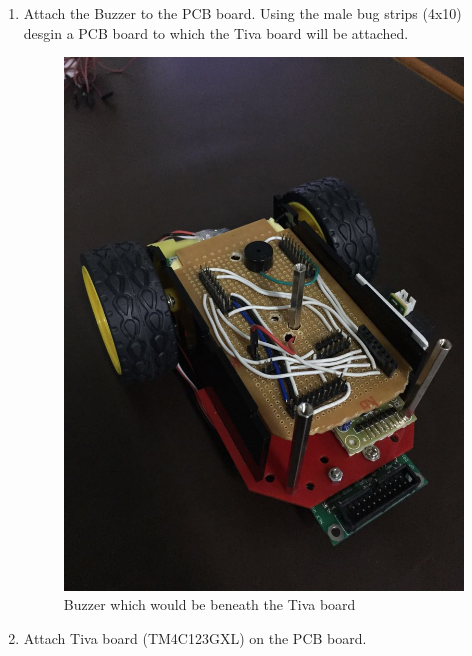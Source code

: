 \documentclass[a4paper,12pt,oneside]{book}
\begin{document}
\begin{enumerate}
\item Attach the Buzzer to the PCB board. Using the male bug strips (4x10) desgin a PCB board to which the Tiva board will be attached.
\begin{figure}[h]
        \centering
        \includegraphics[scale=0.16]{buzzer}
        \caption{Buzzer which would be beneath the Tiva board}
      \end{figure}
\item Attach Tiva board (TM4C123GXL) on the PCB board.
\begin{figure}[h]
        \centering

\end{figure}
\end{enumerate}
\end{document}
